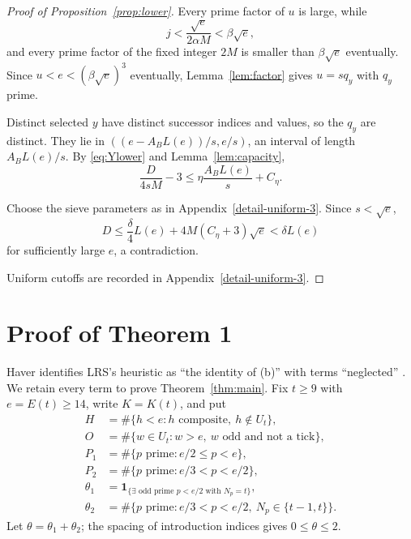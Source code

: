 \documentclass[11pt]{article}
\theoremstyle{remark}
\newcommand{\U}{U}
\newcommand{\ind}[1]{\mathbf{1}_{\{#1\}}}
\begin{document}
\begin{proof}[Proof of Proposition~\ref{prop:lower}]
Every prime factor of $u$ is large, while
\[
 j<\frac{\sqrt e}{2\alpha M}<\beta\sqrt e,
\]
and every prime factor of the fixed integer $2M$ is smaller than
$\beta\sqrt e$ eventually. Since $u<e<(\beta\sqrt e)^3$ eventually, Lemma~\ref{lem:factor}
gives $u=sq_y$ with $q_y$ prime. %


Distinct selected $y$ have distinct successor indices and values,
so the $q_y$ are distinct. They lie in
$((e-A_BL(e))/s,e/s)$, an interval of length $A_BL(e)/s$.
By \eqref{eq:Ylower} and Lemma~\ref{lem:capacity},
\[
 \frac{D}{4sM}-3\leq\eta\frac{A_BL(e)}s+C_\eta.
\]
\par\noindent Choose the sieve parameters as in Appendix~\ref{detail-uniform-3}.
Since $s<\sqrt e$,
\[
 D\leq\frac\delta4L(e)+4M(C_\eta+3)\sqrt e
                           <\delta L(e)
\]
for sufficiently large $e$, a contradiction.

\par\noindent Uniform cutoffs are recorded in Appendix~\ref{detail-uniform-3}.
\end{proof}

\section{Proof of Theorem 1}\label{sec:clock}

Haver identifies LRS's heuristic \cite[Section~4, (6)]{lrs} as ``the identity of (b)''
with terms ``neglected'' \cite[remark after Corollary~12]{haver}.
We retain every term to prove Theorem~\ref{thm:main}. Fix $t\geq9$ with
$e=E(t)\geq14$, write $K=K(t)$, and put
\begin{align*}
 H&=\#\{h<e:h\text{ composite},\ h\notin\U_t\},\\
 O&=\#\{w\in\U_t:w>e,\ w\text{ odd and not a tick}\},\\
 P_1&=\#\{p\text{ prime}:e/2\leq p<e\},\\
 P_2&=\#\{p\text{ prime}:e/3<p<e/2\},\\
 \theta_1&=\ind{\exists\text{ odd prime }p<e/2\text{ with }N_p=t},\\
 \theta_2&=\#\{p\text{ prime}:e/3<p<e/2,\ N_p\in\{t-1,t\}\}.
\end{align*}
Let $\theta=\theta_1+\theta_2$; the spacing of introduction indices
gives $0\leq\theta\leq2$.
\end{document}
